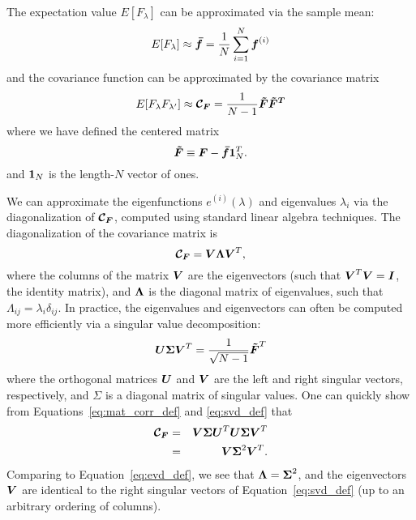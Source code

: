 The expectation value $E[F_\lambda]$ can be approximated via the sample mean:
\begin{equation}
  E[F_\lambda] \approx \boldsymbol{\bar{f}}
  = \frac{1}{N} \sum_{i=1}^N \boldsymbol{f}^{(i)}
\end{equation}
and the covariance function can be approximated by the covariance matrix
\begin{equation}
  \label{eq:mat_corr_def}
  E[F_\lambda F_{\lambda^\prime}] \approx 
  \boldsymbol{\mathcal{C}_F} = \frac{1}{N - 1} \boldsymbol{\tilde{F}} \boldsymbol{\tilde{F}^T}
\end{equation}
where we have defined the centered matrix
\begin{equation}
  \boldsymbol{\tilde{F}} \equiv \boldsymbol{F} - \boldsymbol{\bar{f}}\boldsymbol{1}_N^T.
\end{equation}
and $\boldsymbol{1}_N$ is the length-$N$ vector of ones.

We can approximate the eigenfunctions $e^{(i)}(\lambda)$ and
eigenvalues $\lambda_i$ via the diagonalization 
of $\boldsymbol{\mathcal{C}_F}$, computed using standard linear algebra techniques.
The diagonalization of the covariance matrix is
\begin{equation}
  \label{eq:evd_def}
  \boldsymbol{\mathcal{C}_F} = \boldsymbol{V}\boldsymbol{\Lambda}\boldsymbol{V}^T,
\end{equation}
where the columns of the matrix $\boldsymbol{V}$ are the eigenvectors
(such that $\boldsymbol{V}^T \boldsymbol{V} = \boldsymbol{I}$, the identity matrix), and
$\boldsymbol{\Lambda}$ is the diagonal matrix of eigenvalues, such that
$\Lambda_{ij} = \lambda_i\delta_{ij}$.  In practice, the eigenvalues and
eigenvectors can often be computed more efficiently via a singular value
decomposition:
\begin{equation}
  \label{eq:svd_def}
  \boldsymbol{U}\boldsymbol{\Sigma}\boldsymbol{V}^T
  = \frac{1}{\sqrt{N - 1}}\boldsymbol{\tilde{F}}^T
\end{equation}
where the orthogonal matrices $\boldsymbol{U}$ and $\boldsymbol{V}$ are the left and
right singular vectors, respectively, and $\Sigma$ is a diagonal matrix
of singular values.  One can quickly show from Equations~\ref{eq:mat_corr_def}
and \ref{eq:svd_def} that
\begin{eqnarray}
  \boldsymbol{\mathcal{C}_F}
  &=& \boldsymbol{V}\boldsymbol{\Sigma}\boldsymbol{U}^T
  \boldsymbol{U}\boldsymbol{\Sigma}\boldsymbol{V}^T\nonumber\\
  &=& \boldsymbol{V}\boldsymbol{\Sigma}^2\boldsymbol{V}^T.
\end{eqnarray}
Comparing to Equation~\ref{eq:evd_def}, we see that 
$\boldsymbol{\Lambda} = \boldsymbol{\Sigma}^2$, and the eigenvectors $\boldsymbol{V}$ are
identical to the right singular vectors of Equation~\ref{eq:svd_def}
(up to an arbitrary ordering of columns).


